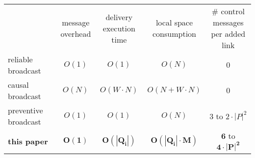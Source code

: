 \newcommand{\cmark}{\ding{51}}%
\newcommand{\xmark}{\ding{55}}%


\small

\begin{tabularx}{1.7\columnwidth}{@{}Xcccc@{}}
  & \makecell{message\\overhead} &  \makecell{delivery\\execution time} & \makecell{local space\\consumption} & \makecell{\# control messages\\per added link} \\ \cmidrule{2-5}
  reliable broadcast~\cite{hadzilacos1994modular} & $O(1)$ & $O(1)$ & $O(N)$ & $0$ \\
  causal broadcast~\cite{schwarz1994detecting} & $O(N)$ & $O(W \cdot N)$ & $O(N+W\cdot N)$ & $0$ \\ 
  preventive broadcast~\cite{nedelec2018pcbroadcast} & $O(1)$ & $O(1)$ & $O(N)$ & $3$ to $2\cdot |P|^2$ \\ \hline\hline
  \textbf{this paper} & $\mathbf{O(1)}$ & $\mathbf{O(|Q_i|)}$ & $\mathbf{O(|Q_i| \cdot M)}$ & $\mathbf{6}$ to $\mathbf{4\cdot|P|^2}$ \\
\end{tabularx}

